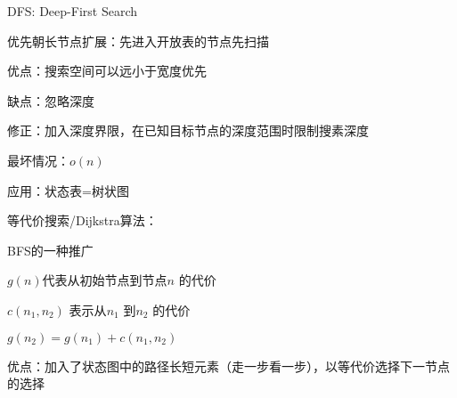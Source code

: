 \begin{notation}
    DFS: Deep-First Search

    优先朝长节点扩展：先进入开放表的节点先扫描

    优点：搜索空间可以远小于宽度优先

    缺点：忽略深度

    修正：加入深度界限，在已知目标节点的深度范围时限制搜素深度

    最坏情况：$o\left( n \right) $
\end{notation}
应用：状态表=树状图 
\begin{notation}
    等代价搜索/Dijkstra算法：

    BFS的一种推广

    $g\left( n \right) $代表从初始节点到节点$n$ 的代价

    $c\left( n_1,n_2 \right) $ 表示从$n_1$ 到$n_2$ 的代价

    $g\left( n_2 \right) =g\left( n_1 \right) +c\left( n_1,n_2 \right) $ 

    优点：加入了状态图中的路径长短元素（走一步看一步），以等代价选择下一节点的选择
\end{notation}


